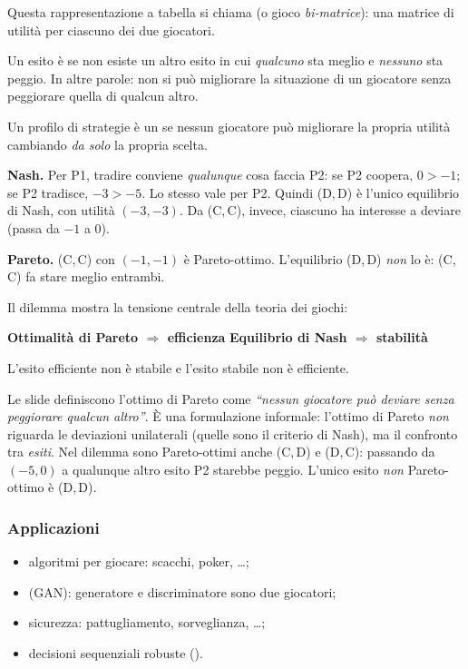 Questa rappresentazione a tabella si chiama  (o gioco \emph{bi-matrice}):
una matrice di utilità per ciascuno dei due giocatori.

\begin{definizione}
Un esito è  se non esiste un altro esito in cui \emph{qualcuno} sta meglio
e \emph{nessuno} sta peggio. In altre parole: non si può migliorare la situazione di un
giocatore senza peggiorare quella di qualcun altro.
\end{definizione}

\begin{definizione}
Un profilo di strategie è un  se nessun giocatore può migliorare
la propria utilità cambiando \emph{da solo} la propria scelta.
\end{definizione}

\begin{esempio}
\textbf{Nash.} Per P1, tradire conviene \emph{qualunque} cosa faccia P2:
se P2 coopera, $0 > -1$; se P2 tradisce, $-3 > -5$. Lo stesso vale per P2.
Quindi (D,\,D) è l'unico equilibrio di Nash, con utilità $(-3,-3)$.
Da (C,\,C), invece, ciascuno ha interesse a deviare (passa da $-1$ a $0$).

\textbf{Pareto.} (C,\,C) con $(-1,-1)$ è Pareto-ottimo. L'equilibrio (D,\,D) \emph{non} lo è:
(C,\,C) fa stare meglio entrambi.
\end{esempio}

Il dilemma mostra la tensione centrale della teoria dei giochi:
\begin{center}
\textbf{Ottimalità di Pareto $\Rightarrow$ efficienza}\qquad
\textbf{Equilibrio di Nash $\Rightarrow$ stabilità}
\end{center}
L'esito efficiente non è stabile e l'esito stabile non è efficiente.

\begin{attenzione}
Le slide definiscono l'ottimo di Pareto come \emph{``nessun giocatore può deviare senza peggiorare
qualcun altro''}. È una formulazione informale: l'ottimo di Pareto \emph{non} riguarda le deviazioni
unilaterali (quelle sono il criterio di Nash), ma il confronto tra \emph{esiti}. Nel dilemma sono
Pareto-ottimi anche (C,\,D) e (D,\,C): passando da $(-5,0)$ a qualunque altro esito P2 starebbe
peggio. L'unico esito \emph{non} Pareto-ottimo è (D,\,D).
\end{attenzione}

\subsubsection*{Applicazioni}
\begin{itemize}
  \item algoritmi per giocare: scacchi, poker, \ldots;
  \item {} (GAN): generatore e discriminatore sono due giocatori;
  \item sicurezza: pattugliamento, sorveglianza, \ldots;
  \item decisioni sequenziali robuste ().
\end{itemize}

